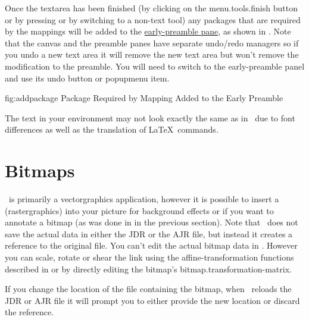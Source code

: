 Once the \gls{textarea} has been finished (by clicking on the
\gls{menu.tools.finish} button or by pressing
 or by switching to a non-text
tool) any packages that are required by the mappings will be added
to the \hyperref[sec:preamble]{early-preamble pane}, as shown in
.  Note that the \gls{canvas} and the
preamble panes have separate undo\slash redo managers so if you undo
a new text area it will remove the new text area but won't remove
the modification to the preamble. You will need to switch to the
early-preamble panel and use its undo button or \gls{popupmenu} item.

\FloatFig
  {fig:addpackage}
  {}
  {Package Required by Mapping Added to the Early Preamble}

\begin{important}
The text in your  environment may not
look exactly the same as in \FlowframTk\ due to font differences as
well as the translation of \LaTeX\ commands.
\end{important}


\chapter{Bitmaps}\label{sec:insertbitmap}


\FlowframTk\ is primarily a \gls{vectorgraphics} application,
however it is possible to insert a 
(\gls{rastergraphics}) into your picture for background effects or
if you want to annotate a \gls{bitmap} (as was done in
 in the previous section).  Note that
\FlowframTk\ does not save the actual  data in either
the \gls{JDR} or the \gls{AJR} file, but instead it creates a reference
to the original file. You can't edit the actual bitmap data in
\FlowframTk. However you can scale, rotate or shear the link
using the \gls{affine-transformation} functions described in 
 or by directly editing the
bitmap's \gls{bitmap.transformation-matrix}. 

\begin{important}
If you change the location of the file containing the bitmap, when
\FlowframTk\ reloads the \gls*{JDR} or \gls*{AJR} file it will
prompt you to either provide the new location or discard the reference.
\end{important}

